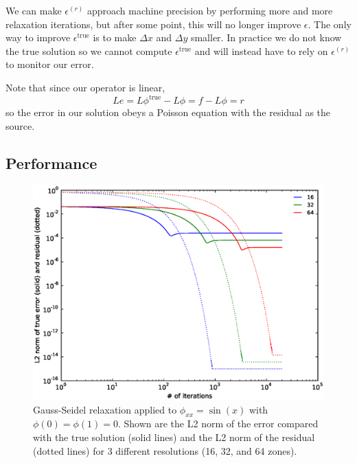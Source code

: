 We can make $\epsilon^{(r)}$ approach machine precision by performing
more and more relaxation iterations, but after some point, this will
no longer improve $\epsilon$.  The only way to improve
$\epsilon^\mathrm{true}$ is to make $\Delta x$ and $\Delta y$ smaller.
In practice we do not know the true solution so we cannot compute
$\epsilon^\mathrm{true}$ and will instead have to rely on
$\epsilon^{(r)}$ to monitor our error.

Note that since our operator is linear,
\begin{equation}
L e = L\phi^\mathrm{true} - L\phi = f - L\phi = r
\end{equation}
so the error in our solution obeys a Poisson equation with the residual
as the source.

\subsection{Performance}


\begin{figure}
\centering
\includegraphics[width=\linewidth]{smooth-error.eps}
\caption[Convergence as a function of number of iterations using Gauss-Seidel relaxation.]{\label{fig:smootherror} Gauss-Seidel relaxation applied to
  $\phi_{xx} = \sin(x)$ with $\phi(0) = \phi(1) = 0$.  Shown are the
  L2 norm of the error compared with the true solution (solid lines)
  and the L2 norm of the residual (dotted lines) for 3 different
  resolutions (16, 32, and 64 zones).}
\end{figure}

